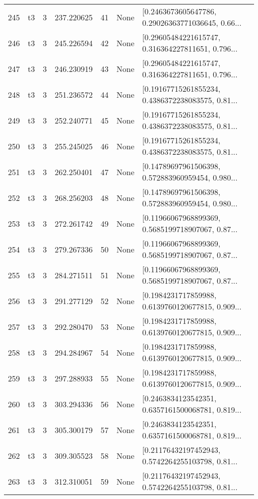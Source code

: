 \begin{tabular}{lllrlll}
245 &  t3 &   3 &  237.220625 &   41 &  None &  [0.2463673605647786, 0.29026363771036645, 0.66... \\
246 &  t3 &   3 &  245.226594 &   42 &  None &  [0.29605484221615747, 0.316364227811651, 0.796... \\
247 &  t3 &   3 &  246.230919 &   43 &  None &  [0.29605484221615747, 0.316364227811651, 0.796... \\
248 &  t3 &   3 &  251.236572 &   44 &  None &  [0.19167715261855234, 0.4386372238083575, 0.81... \\
249 &  t3 &   3 &  252.240771 &   45 &  None &  [0.19167715261855234, 0.4386372238083575, 0.81... \\
250 &  t3 &   3 &  255.245025 &   46 &  None &  [0.19167715261855234, 0.4386372238083575, 0.81... \\
251 &  t3 &   3 &  262.250401 &   47 &  None &  [0.14789697961506398, 0.572883960959454, 0.980... \\
252 &  t3 &   3 &  268.256203 &   48 &  None &  [0.14789697961506398, 0.572883960959454, 0.980... \\
253 &  t3 &   3 &  272.261742 &   49 &  None &  [0.11966067968899369, 0.5685199718907067, 0.87... \\
254 &  t3 &   3 &  279.267336 &   50 &  None &  [0.11966067968899369, 0.5685199718907067, 0.87... \\
255 &  t3 &   3 &  284.271511 &   51 &  None &  [0.11966067968899369, 0.5685199718907067, 0.87... \\
256 &  t3 &   3 &  291.277129 &   52 &  None &  [0.1984231717859988, 0.6139760120677815, 0.909... \\
257 &  t3 &   3 &  292.280470 &   53 &  None &  [0.1984231717859988, 0.6139760120677815, 0.909... \\
258 &  t3 &   3 &  294.284967 &   54 &  None &  [0.1984231717859988, 0.6139760120677815, 0.909... \\
259 &  t3 &   3 &  297.288933 &   55 &  None &  [0.1984231717859988, 0.6139760120677815, 0.909... \\
260 &  t3 &   3 &  303.294336 &   56 &  None &  [0.2463834123542351, 0.6357161500068781, 0.819... \\
261 &  t3 &   3 &  305.300179 &   57 &  None &  [0.2463834123542351, 0.6357161500068781, 0.819... \\
262 &  t3 &   3 &  309.305523 &   58 &  None &  [0.21176432197452943, 0.5742264255103798, 0.81... \\
263 &  t3 &   3 &  312.310051 &   59 &  None &  [0.21176432197452943, 0.5742264255103798, 0.81... \\

\end{tabular}
